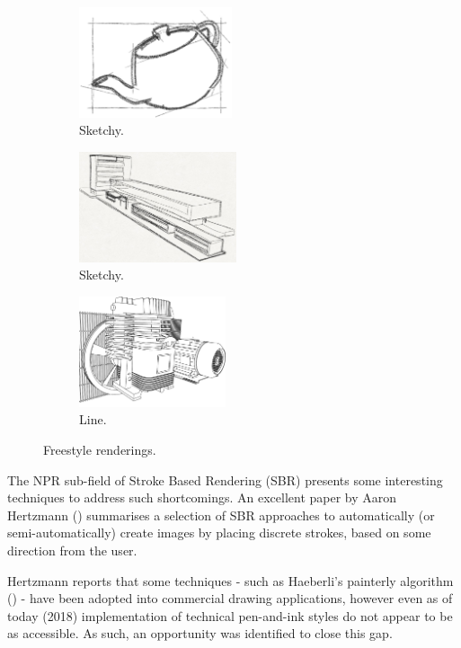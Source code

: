 \begin{figure}[h]
	\centering
	\begin{subfigure}[b]{0.3\textwidth}
		\includegraphics[height=3.25cm]{images/ex_sketchy1}
		\caption{Sketchy.}\label{ex_sketchy1}
	\end{subfigure}
	\begin{subfigure}[b]{0.3\textwidth}
		\includegraphics[height=3.25cm]{images/ex_sketchy2}
		\caption{Sketchy.}\label{ex_sketchy2}
	\end{subfigure}
	\begin{subfigure}[b]{0.3\textwidth}
		\includegraphics[height=3.25cm]{images/ex_line}
		\caption{Line.}\label{ex_line}
	\end{subfigure}
	\caption{Freestyle renderings.}
\end{figure}

The NPR sub-field of Stroke Based Rendering (SBR) presents some interesting techniques to address such shortcomings.
An excellent paper by Aaron Hertzmann (\cite{hertzmann2002}) summarises a selection of SBR approaches to automatically (or semi-automatically) create images by placing discrete strokes, based on some direction from the user.

Hertzmann reports that some techniques - such as Haeberli's painterly algorithm (\cite{haeberli1990}) - have been adopted into commercial drawing applications, however even as of today (2018) implementation of technical pen-and-ink styles do not appear to be as accessible.
As such, an opportunity was identified to close this gap.

